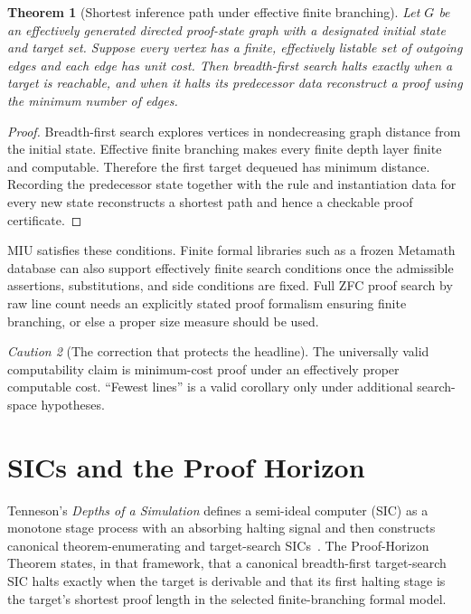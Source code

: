 \documentclass[11pt,oneside]{book}
\newtheorem{theorem}{Theorem}[chapter]
\theoremstyle{definition}
\theoremstyle{remark}
\newtheorem{caution}[theorem]{Caution}
\begin{document}
\begin{theorem}[Shortest inference path under effective finite branching]\label{thm:bfs}
Let $G$ be an effectively generated directed proof-state graph with a designated initial state and target set. Suppose every vertex has a finite, effectively listable set of outgoing edges and each edge has unit cost. Then breadth-first search halts exactly when a target is reachable, and when it halts its predecessor data reconstruct a proof using the minimum number of edges.
\end{theorem}
\begin{proof}
Breadth-first search explores vertices in nondecreasing graph distance from the initial state. Effective finite branching makes every finite depth layer finite and computable. Therefore the first target dequeued has minimum distance. Recording the predecessor state together with the rule and instantiation data for every new state reconstructs a shortest path and hence a checkable proof certificate.
\end{proof}

MIU satisfies these conditions. Finite formal libraries such as a frozen Metamath database can also support effectively finite search conditions once the admissible assertions, substitutions, and side conditions are fixed. Full ZFC proof search by raw line count needs an explicitly stated proof formalism ensuring finite branching, or else a proper size measure should be used.

\begin{caution}[The correction that protects the headline]
The universally valid computability claim is minimum-cost proof under an effectively proper computable cost. ``Fewest lines'' is a valid corollary only under additional search-space hypotheses.
\end{caution}

\chapter{SICs and the Proof Horizon}
Tenneson's \emph{Depths of a Simulation} defines a semi-ideal computer (SIC) as a monotone stage process with an absorbing halting signal and then constructs canonical theorem-enumerating and target-search SICs~\cite{tennesonSIC}. The Proof-Horizon Theorem states, in that framework, that a canonical breadth-first target-search SIC halts exactly when the target is derivable and that its first halting stage is the target's shortest proof length in the selected finite-branching formal model.
\end{document}
